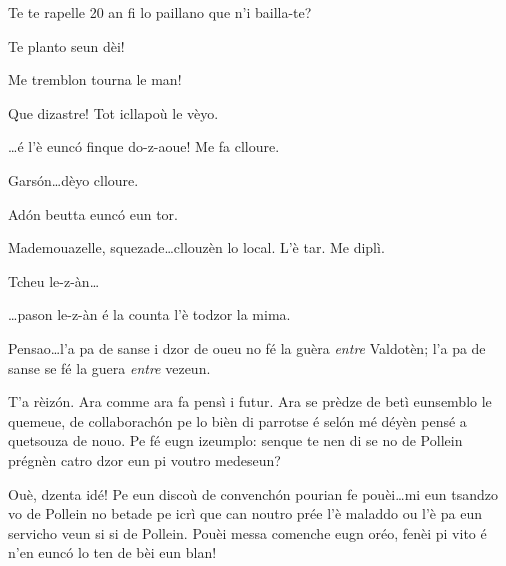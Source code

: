 \begin{drama}
\Pinospeaks{} Te te rapelle 20 an fi lo paillano que n'i bailla-te? 

\Selmospeaks{} Te planto seun dèi!

\Pinospeaks{} Me tremblon tourna le man!


\Dorinaspeaks Que dizastre! Tot icllapoù le vèyo.

\Genespeaks \ldots é l'è eunc\'o finque do-z-aoue! Me fa clloure.

\Genespeaks{} Gars\'on\ldots dèyo clloure.

\Marteunspeaks Ad\'on beutta eunc\'o eun tor.


\Dorinaspeaks{} Mademouazelle, squezade\ldots cllouzèn lo local. L'è tar. Me diplì.


\Genespeaks Tcheu le-z-àn\ldots

\Dorinaspeaks \ldots pason le-z-àn é la counta l'è todzor la mima.

\ridocliou




\Laurentspeaks{} Pensao\ldots l'a pa de sanse i dzor de oueu no fé la guèra \textit{entre} Valdotèn; l'a pa de sanse se fé la guera \textit{entre} vezeun.

\Taniaspeaks T'a rèiz\'on. Ara comme ara fa pensì i futur. Ara se prèdze de betì eunsemblo le quemeue, de collaborach\'on pe lo bièn di parrotse é sel\'on mé déyèn pensé a quetsouza de nouo. Pe fé eugn izeumplo: senque te nen di se no de Pollein prégnèn catro dzor eun pi voutro medeseun?

\Laurentspeaks Ouè, dzenta idé! Pe eun discoù de convench\'on pourian fe pouèi\ldots mi eun tsandzo vo de Pollein no betade pe icrì que can noutro prée l'è maladdo ou l'è pa eun servicho veun si si de Pollein. Pouèi messa comenche eugn oréo, fenèi pi vito é n'en eunc\'o lo ten de bèi eun blan!


\end{drama}
